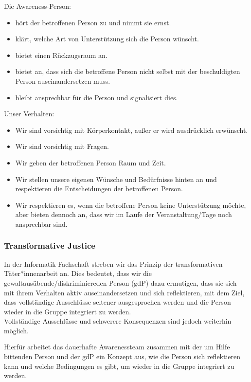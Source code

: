 \documentclass{article}
\begin{document}
Die Awareness-Person:
\begin{itemize}
    \item hört der betroffenen Person zu und nimmt sie ernst.
    \item klärt, welche Art von Unterstützung sich die Person wünscht.
    \item bietet einen Rückzugsraum an.
    \item bietet an, dass sich die betroffene Person nicht selbst mit der beschuldigten Person auseinandersetzen muss.
    \item bleibt ansprechbar für die Person und signalisiert dies.
\end{itemize}
Unser Verhalten:
\begin{itemize}
    \item Wir sind vorsichtig mit Körperkontakt, außer er wird ausdrücklich erwünscht.
    \item Wir sind vorsichtig mit Fragen.
    \item Wir geben der betroffenen Person Raum und Zeit.
    \item Wir stellen unsere eigenen Wünsche und Bedürfnisse hinten an und respektieren die Entscheidungen der betroffenen Person.
    \item Wir respektieren es, wenn die betroffene Person keine Unterstützung möchte, aber bieten dennoch an, dass wir im Laufe der Veranstaltung/Tage noch ansprechbar sind.
\end{itemize}

\subsubsection{Transformative Justice}

In der Informatik-Fachschaft streben wir das Prinzip der transformativen Täter*innenarbeit an.
Dies bedeutet, dass wir die gewaltausübende/diskriminiereden Person (gdP) dazu ermutigen, 
dass sie sich mit ihrem Verhalten aktiv auseinandersetzen und sich reflektieren,
mit dem Ziel, dass vollständige Ausschlüsse seltener ausgesprochen werden und die Person wieder in die Gruppe integriert zu werden.\\
Vollständige Ausschlüsse und schwerere Konsequenzen sind jedoch weiterhin möglich.

Hierfür arbeitet das dauerhafte Awarenessteam zusammen mit der um Hilfe bittenden Person
und der gdP ein Konzept aus, wie die Person sich
reflektieren kann und welche Bedingungen es gibt, um wieder in die Gruppe integriert zu werden.
\end{document}
